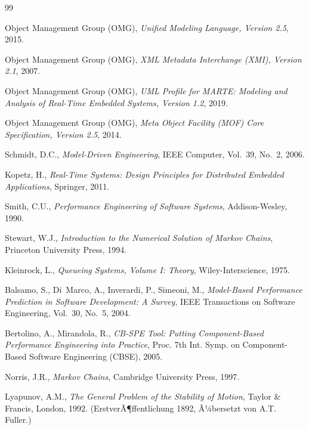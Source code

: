﻿\documentclass[a4paper,12pt]{scrreprt}
\theoremstyle{definition}
\begin{document}
\begin{thebibliography}{99}
	
	Object Management Group (OMG),
	\textit{Unified Modeling Language, Version 2.5},
	2015.
	
	Object Management Group (OMG),
	\textit{XML Metadata Interchange (XMI), Version 2.1},
	2007.
	
	Object Management Group (OMG),
	\textit{UML Profile for MARTE: Modeling and Analysis of Real-Time
		Embedded Systems, Version 1.2},
	2019.
	
	Object Management Group (OMG),
	\textit{Meta Object Facility (MOF) Core Specification, Version 2.5},
	2014.
	
	Schmidt, D.C.,
	\textit{Model-Driven Engineering},
	IEEE Computer, Vol.~39, No.~2, 2006.
	
	Kopetz, H.,
	\textit{Real-Time Systems: Design Principles for Distributed
		Embedded Applications},
	Springer, 2011.
	
	Smith, C.U.,
	\textit{Performance Engineering of Software Systems},
	Addison-Wesley, 1990.
	
	Stewart, W.J.,
	\textit{Introduction to the Numerical Solution of Markov Chains},
	Princeton University Press, 1994.
	
	Kleinrock, L.,
	\textit{Queueing Systems, Volume I: Theory},
	Wiley-Interscience, 1975.
	
	Balsamo, S., Di~Marco, A., Inverardi, P., Simeoni, M.,
	\textit{Model-Based Performance Prediction in Software Development:
		A Survey},
	IEEE Transactions on Software Engineering, Vol.~30, No.~5, 2004.
	
	Bertolino, A., Mirandola, R.,
	\textit{CB-SPE Tool: Putting Component-Based Performance Engineering
		into Practice},
	Proc. 7th Int. Symp. on Component-Based Software Engineering
	(CBSE), 2005.
	
	Norris, J.R.,
	\textit{Markov Chains},
	Cambridge University Press, 1997.
	
	Lyapunov, A.M.,
	\textit{The General Problem of the Stability of Motion},
	Taylor \& Francis, London, 1992.
	(ErstverÃ¶ffentlichung 1892, Ã¼bersetzt von A.T. Fuller.)
	

\end{thebibliography}
\end{document}
